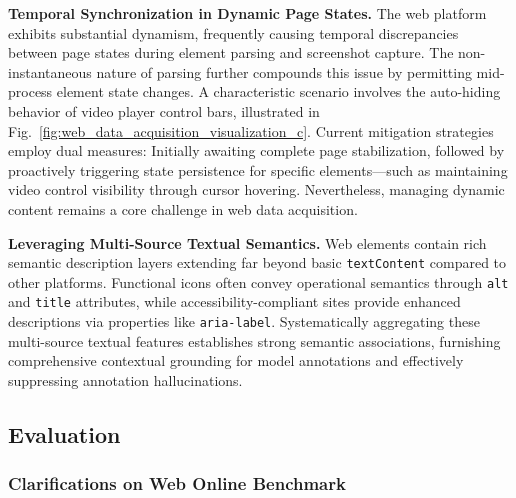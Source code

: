 \textbf{Temporal Synchronization in Dynamic Page States.} 
The web platform exhibits substantial dynamism, frequently causing temporal discrepancies between page states during element parsing and screenshot capture. The non-instantaneous nature of parsing further compounds this issue by permitting mid-process element state changes. A characteristic scenario involves the auto-hiding behavior of video player control bars, illustrated in Fig.~\ref{fig:web_data_acquisition_visualization_c}. Current mitigation strategies employ dual measures: Initially awaiting complete page stabilization, followed by proactively triggering state persistence for specific elements—such as maintaining video control visibility through cursor hovering. Nevertheless, managing dynamic content remains a core challenge in web data acquisition.

\textbf{Leveraging Multi-Source Textual Semantics.} 
Web elements contain rich semantic description layers extending far beyond basic \texttt{textContent} compared to other platforms. Functional icons often convey operational semantics through \texttt{alt} and \texttt{title} attributes, while accessibility-compliant sites provide enhanced descriptions via properties like \texttt{aria-label}. Systematically aggregating these multi-source textual features establishes strong semantic associations, furnishing comprehensive contextual grounding for model annotations and effectively suppressing annotation hallucinations.




\subsection{Evaluation}
\subsubsection{Clarifications on Web Online Benchmark}
\label{appendix:web_online_evaluation}

